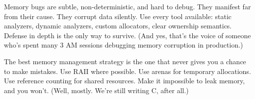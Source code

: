 \begin{warningbox}
Memory bugs are subtle, non-deterministic, and hard to debug. They manifest far from their cause. They corrupt data silently. Use every tool available: static analyzers, dynamic analyzers, custom allocators, clear ownership semantics. Defense in depth is the only way to survive. (And yes, that's the voice of someone who's spent many 3 AM sessions debugging memory corruption in production.)
\end{warningbox}

\begin{tipbox}
The best memory management strategy is the one that never gives you a chance to make mistakes. Use RAII where possible. Use arenas for temporary allocations. Use reference counting for shared resources. Make it impossible to leak memory, and you won't. (Well, mostly. We're still writing C, after all.)
\end{tipbox}
